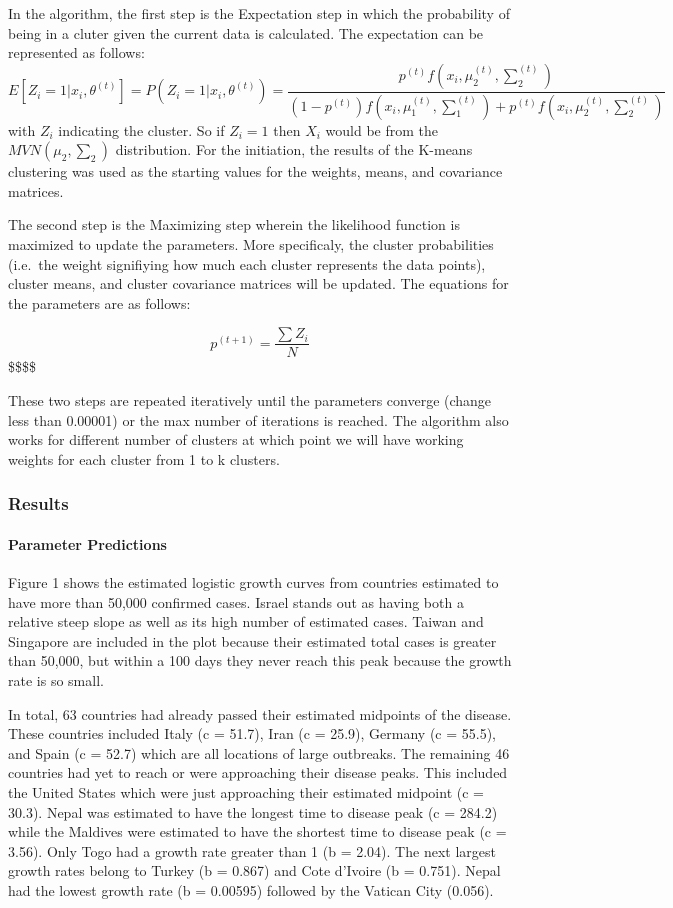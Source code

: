 \documentclass[]{article}
\let\oldparagraph\paragraph
\renewcommand{\paragraph}[1]{\oldparagraph{#1}\mbox{}}
\begin{document}
In the algorithm, the first step is the Expectation step in which the
probability of being in a cluter given the current data is calculated.
The expectation can be represented as follows:
\[E[Z_i=1|x_i, \theta^{(t)}]=P(Z_i=1|x_i, \theta^{(t)}) = \frac{p^{(t)}f(x_i, \mu^{(t)}_2, \sum^{(t)}_2)}{(1-p^{(t)})f(x_i, \mu^{(t)}_1, \sum^{(t)}_1)+p^{(t)}f(x_i, \mu^{(t)}_2, \sum^{(t)}_2)}\]
with \(Z_i\) indicating the cluster. So if \(Z_i=1\) then \(X_i\) would
be from the \(MVN(\mu_2, \sum_2)\) distribution. For the initiation, the
results of the K-means clustering was used as the starting values for
the weights, means, and covariance matrices.

The second step is the Maximizing step wherein the likelihood function
is maximized to update the parameters. More specificaly, the cluster
probabilities (i.e.~the weight signifiying how much each cluster
represents the data points), cluster means, and cluster covariance
matrices will be updated. The equations for the parameters are as
follows:

\[p^{(t+1)}=\frac{\sum Z_i}{N}\] \$\$\$\$

These two steps are repeated iteratively until the parameters converge
(change less than 0.00001) or the max number of iterations is reached.
The algorithm also works for different number of clusters at which point
we will have working weights for each cluster from 1 to k clusters.

\hypertarget{results}{%
\subsubsection{Results}\label{results}}

\hypertarget{parameter-predictions}{%
\paragraph{Parameter Predictions}\label{parameter-predictions}}

Figure 1 shows the estimated logistic growth curves from countries
estimated to have more than 50,000 confirmed cases. Israel stands out as
having both a relative steep slope as well as its high number of
estimated cases. Taiwan and Singapore are included in the plot because
their estimated total cases is greater than 50,000, but within a 100
days they never reach this peak because the growth rate is so small.

In total, 63 countries had already passed their estimated midpoints of
the disease. These countries included Italy (c = 51.7), Iran (c = 25.9),
Germany (c = 55.5), and Spain (c = 52.7) which are all locations of
large outbreaks. The remaining 46 countries had yet to reach or were
approaching their disease peaks. This included the United States which
were just approaching their estimated midpoint (c = 30.3). Nepal was
estimated to have the longest time to disease peak (c = 284.2) while the
Maldives were estimated to have the shortest time to disease peak (c =
3.56). Only Togo had a growth rate greater than 1 (b = 2.04). The next
largest growth rates belong to Turkey (b = 0.867) and Cote d'Ivoire (b =
0.751). Nepal had the lowest growth rate (b = 0.00595) followed by the
Vatican City (0.056).
\end{document}
